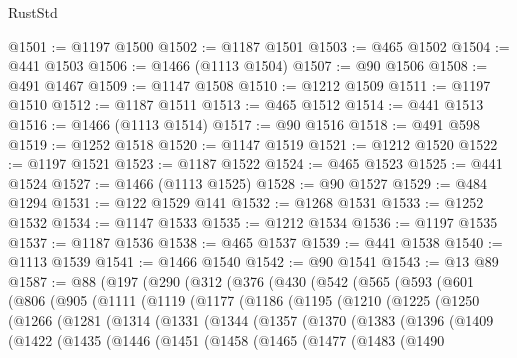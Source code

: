 \begin{lexlean}{RustStd}
\begin{coremodule}
@1501 := @1197 @1500
@1502 := @1187 @1501
@1503 := @465 @1502
@1504 := @441 @1503
@1506 := @1466 (@1113 @1504)
@1507 := @90 @1506
@1508 := @491 @1467
@1509 := @1147 @1508
@1510 := @1212 @1509
@1511 := @1197 @1510
@1512 := @1187 @1511
@1513 := @465 @1512
@1514 := @441 @1513
@1516 := @1466 (@1113 @1514)
@1517 := @90 @1516
@1518 := @491 @598
@1519 := @1252 @1518
@1520 := @1147 @1519
@1521 := @1212 @1520
@1522 := @1197 @1521
@1523 := @1187 @1522
@1524 := @465 @1523
@1525 := @441 @1524
@1527 := @1466 (@1113 @1525)
@1528 := @90 @1527
@1529 := @484 @1294
@1531 := @122 @1529 @141
@1532 := @1268 @1531
@1533 := @1252 @1532
@1534 := @1147 @1533
@1535 := @1212 @1534
@1536 := @1197 @1535
@1537 := @1187 @1536
@1538 := @465 @1537
@1539 := @441 @1538
@1540 := @1113 @1539
@1541 := @1466 @1540
@1542 := @90 @1541
@1543 := @13 @89
@1587 := @88
    (@197
      (@290
        (@312
          (@376
            (@430
              (@542
                (@565
                  (@593
                    (@601
                      (@806
                        (@905
                          (@1111
                            (@1119
                              (@1177
                                (@1186
                                  (@1195
                                    (@1210
                                      (@1225
                                        (@1250
                                          (@1266
                                            (@1281
                                              (@1314
                                                (@1331
                                                  (@1344
                                                    (@1357
                                                      (@1370
                                                        (@1383
                                                          (@1396
                                                            (@1409
                                                              (@1422
                                                                (@1435
                                                                  (@1446
                                                                    (@1451
                                                                      (@1458
                                                                        (@1465
                                                                          (@1477
                                                                            (@1483
                                                                              (@1490

\end{coremodule}
\end{lexlean}
